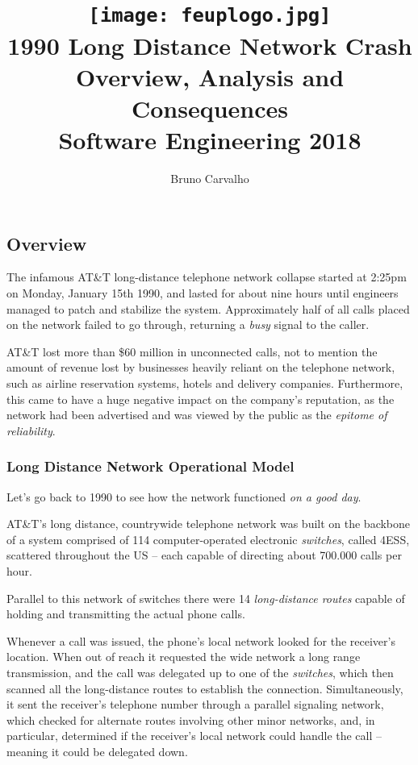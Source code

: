 \documentclass[12pt,a4paper,notitlepage]{article}
\title{
	\vspace{-2\baselineskip}
	\texttt{[image: feuplogo.jpg]}\\
	{\Huge \att{} 1990 Long Distance Network Crash}\\
	{\Large Overview, Analysis and Consequences}\\
	{\normalsize Software Engineering 2018}
}
\author{
	Bruno Carvalho \hspace*{1em} \text{up201606517}
}
\newcommand*{\att}{AT\&T}
\begin{document}
\maketitle
\thispagestyle{empty}

\subsection{Overview}

The infamous \att{} long-distance telephone network collapse started at 2:25pm on Monday, January 15th 1990, and lasted for about nine hours until engineers managed to patch and stabilize the system.\supercite{att-dennisburke1995}
Approximately half of all calls placed on the network failed to go through, returning a \emph{busy} signal to the caller.

\att{} lost more than \$60 million in unconnected calls, not to mention the amount of revenue lost by businesses heavily reliant on the telephone network, such as airline reservation systems, hotels and delivery companies. Furthermore, this came to have a huge negative impact on the company's reputation, as the network had been advertised and was viewed by the public as the \textsl{epitome of reliability}.\supercite{att-popularscience1990}

\subsubsection{Long Distance Network Operational Model}

Let's go back to 1990 to see how the network functioned \textsl{on a good day}.

\att{}'s long distance, countrywide telephone network was built on the backbone of a system comprised of 114 computer-operated electronic \emph{switches}, called 4ESS, scattered throughout the US -- each capable of directing about 700.000 calls per hour.

Parallel to this network of switches there were 14 \emph{long-distance routes} capable of holding and transmitting the actual phone calls.\supercite{att-dennisburke1995}

Whenever a call was issued, the phone's local network looked for the receiver's location.
When out of reach it requested the wide network a long range transmission, and the call was delegated up to one of the \emph{switches}, which then scanned all the long-distance routes to establish the connection.
Simultaneously, it sent the receiver's telephone number through a parallel signaling network, which checked for alternate routes involving other minor networks, and, in particular, determined if the receiver's local network could handle the call -- meaning it could be delegated down.
\end{document}
